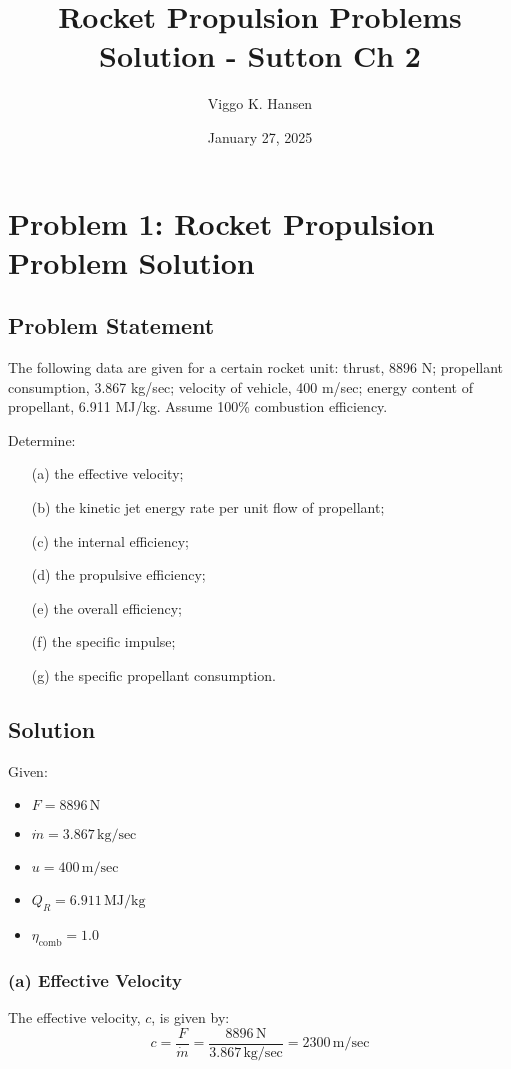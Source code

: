 \documentclass{article}
\title{Rocket Propulsion Problems Solution - Sutton Ch 2}
\author{Viggo K. Hansen}
\date{January 27, 2025}
\begin{document}
\maketitle

\section{Problem 1: Rocket Propulsion Problem Solution}

\subsection{Problem Statement}
The following data are given for a certain rocket unit: thrust, 8896 N; propellant consumption, 3.867 kg/sec; velocity of vehicle, 400 m/sec; energy content of propellant, 6.911 MJ/kg. Assume 100\% combustion efficiency.

Determine:
\begin{itemize}
    \item[(a)] the effective velocity;
    \item[(b)] the kinetic jet energy rate per unit flow of propellant;
    \item[(c)] the internal efficiency;
    \item[(d)] the propulsive efficiency;
    \item[(e)] the overall efficiency;
    \item[(f)] the specific impulse;
    \item[(g)] the specific propellant consumption.
\end{itemize}

\subsection{Solution}

Given:
\begin{itemize}
    \item $F = 8896 \, \text{N}$
    \item $\dot{m} = 3.867 \, \text{kg/sec}$
    \item $u = 400 \, \text{m/sec}$
    \item $Q_R = 6.911 \, \text{MJ/kg}$
    \item $\eta_{\text{comb}} = 1.0$
\end{itemize}

\subsubsection{(a) Effective Velocity}
The effective velocity, $c$, is given by:
\[
c = \frac{F}{\dot{m}} = \frac{8896 \, \text{N}}{3.867 \, \text{kg/sec}} = 2300 \, \text{m/sec}
\]
\end{document}

